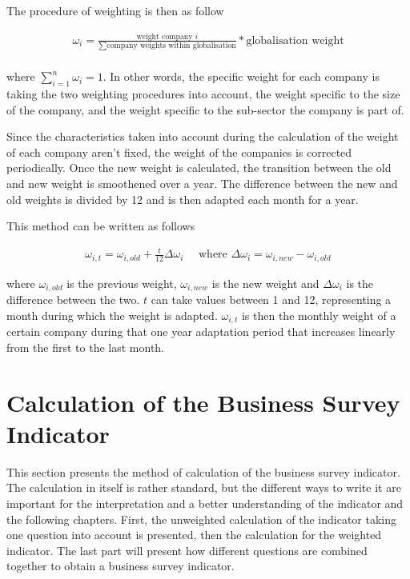 \documentclass[12pt,a4paper,oneside]{book}
\begin{document}
The procedure of weighting is then as follow

\begin{eqnarray}
    \omega_i = \frac{ \text{weight company $i$} }{ \sum\text{company weights within globalisation} } * \text{globalisation weight} \\ \nonumber
\end{eqnarray}

where $\sum_{i=1}^{n} \omega_i = 1 $. In other words, the specific weight for each company is taking the two weighting procedures into account, the weight specific to the size of the company, and the weight specific to the sub-sector the company is part of.

Since the characteristics taken into account during the calculation of the weight of each company aren't fixed, the weight of the companies is corrected periodically. 
Once the new weight is calculated, the transition between the old and new weight is smoothened over a year. The difference between the new and old weights is divided by 12 and is then adapted each month for a year.

This method can be written as follows

\begin{eqnarray}
    \omega_{i, t} = \omega_{i, old} + \frac{t}{12} \Delta \omega_i \quad \text{ where } \Delta \omega_i = \omega_{i, new} - \omega_{i, old} 
\end{eqnarray}

where $\omega_{i, old}$ is the previous weight, $\omega_{i, new}$ is the new weight and $\Delta \omega_i$ is the difference between the two. $t$ can take values between 1 and 12, representing a month during which the weight is adapted.
$\omega_{i, t}$ is then the monthly weight of a certain company during that one year adaptation period that increases linearly from the first to the last month.

\section{Calculation of the Business Survey Indicator}

This section presents the method of calculation of the business survey indicator.
The calculation in itself is rather standard, but the different ways to write it are important for the interpretation and a better understanding of the indicator and the following chapters.
First, the unweighted calculation of the indicator taking one question into account is presented, then the calculation for the weighted indicator. 
The last part will present how different questions are combined together to obtain a business survey indicator.
\end{document}

